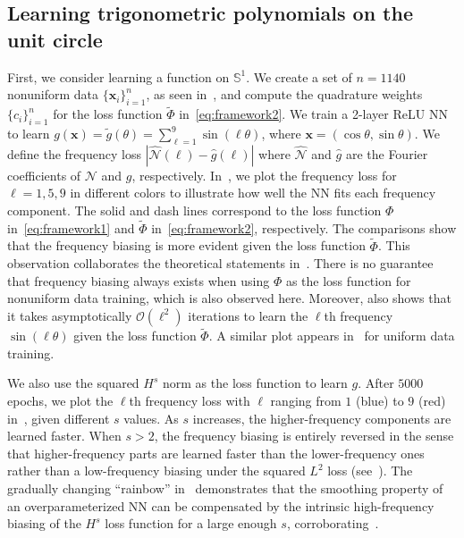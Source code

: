 \documentclass{article} %
\begin{document}
\subsection{Learning trigonometric polynomials on the unit circle}\label{sec:test1}
First, we consider learning a function on $\mathbb{S}^1$. We create a set of $n = 1140$ nonuniform data $\{\mathbf{x}_i\}_{i=1}^n$, as seen in~, and compute the quadrature weights $\{c_i\}_{i=1}^{n}$ for the loss function $\widetilde \Phi$ in~\cref{eq:framework2}. We train a 2-layer ReLU NN to learn $g(\mathbf{x}) = \tilde g(\theta) = \sum_{\ell=1}^9 \sin(\ell \theta)$, where $\mathbf{x} = (\cos\theta, \sin\theta)$. We define the frequency loss $|\widehat{\mathcal{N}}(\ell) - \hat g(\ell) |$ where
$\widehat{\mathcal{N}}$ and $\hat{g}$ are the Fourier coefficients of $\mathcal{N}$ and $g$, respectively. In~, we plot the frequency loss for $\ell=1,5,9$ in different colors to illustrate how well the NN fits each frequency component. The solid and dash lines correspond to the loss function $\Phi$ in~\cref{eq:framework1} and $\widetilde \Phi$ in~\cref{eq:framework2}, respectively. The comparisons show that the frequency biasing is more evident given the loss function $\widetilde \Phi$. This observation collaborates the theoretical statements in~. There is no guarantee that frequency biasing always exists when using $\Phi$ as the loss function for nonuniform data training, which is also observed here. Moreover,  also shows that it takes asymptotically $\mathcal{O}(\ell^2)$ iterations to learn the $\ell$th frequency $\sin(\ell\theta)$ given the loss function $\widetilde \Phi$. A similar plot appears in~\cite{basri} for uniform data training.

We also use the squared $H^s$ norm as the loss function to learn $g$. After $5000$ epochs, we plot the $\ell$th frequency loss with $\ell$ ranging from $1$ (blue) to $9$ (red) in~, given different $s$ values. As $s$ increases, the higher-frequency components are learned faster. When $s> 2$,  the frequency biasing is entirely reversed in the sense that higher-frequency parts are learned faster than the lower-frequency ones rather than a low-frequency biasing under the squared $L^2$ loss (see~). The gradually changing ``rainbow'' in~ demonstrates that the smoothing property of an overparameterized NN can be compensated by the intrinsic high-frequency biasing of the $H^s$ loss function for a large enough $s$, corroborating~.
\end{document}
